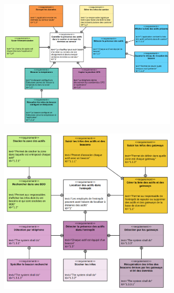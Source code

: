 \documentclass[10pt,a4paper]{article}
\begin{document}
\begin{figure}[h!]
    \centering
    \begin{subfigure}[b]{0.45\textwidth}
        \centering
        \includegraphics[scale=0.14]{Images/diagramme_exigences_camion.png}
        \caption{}
        \label{diagramme_exigences_camion} 
    \end{subfigure}
    \begin{subfigure}[b]{0.45\textwidth}
        \includegraphics[scale=0.14]{Images/diagramme_exigences_entrepot.png}
        \caption{}
        \label{diagramme_exigences_entrepot}
    \end{subfigure}
    \caption{}
\end{figure}
\end{document}
